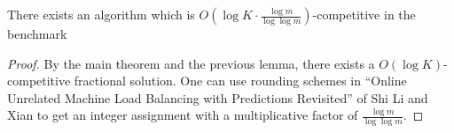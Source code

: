\begin{theorem}
There exists an algorithm which is $O(\log K \cdot \frac{\log m}{ \log \log m})$-competitive in the benchmark
\end{theorem}
%
\begin{proof}
By the main theorem and the previous lemma, there exists a $O(\log K)$-competitive fractional solution. 
One can use rounding schemes in ``Online Unrelated Machine Load Balancing with Predictions Revisited'' of Shi Li and Xian to get an integer assignment with a multiplicative factor of $\frac{\log m}{ \log \log m}$. 
\end{proof}
